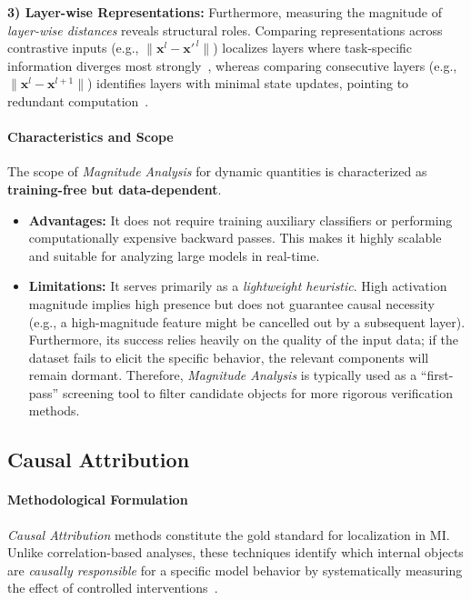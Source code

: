 \documentclass[11pt,letterpaper]{mystyle}
\begin{document}
\textbf{3) Layer-wise Representations:} Furthermore, measuring the magnitude of \textit{layer-wise distances} reveals structural roles. 
Comparing representations across contrastive inputs (e.g., $\lVert \mathbf{x}^l - \mathbf{x}'^{\,l} \rVert$) localizes layers where task-specific information diverges most strongly~\citep{chuang2024dola,zhang-etal-2024-truthx,sun-etal-2025-personality,bas2025steering}, whereas comparing consecutive layers (e.g., $\lVert \mathbf{x}^l - \mathbf{x}^{l+1} \rVert$) identifies layers with minimal state updates, pointing to redundant computation~\citep{dumitru2024layer,elhoushi-etal-2024-layerskip,tan2024dlo,lawson2025learningskipmiddlelayers,men-etal-2025-shortgpt}.


\paragraph{Characteristics and Scope}
The scope of \textit{Magnitude Analysis} for dynamic quantities is characterized as \textbf{training-free but data-dependent}.
\begin{itemize}[leftmargin=*]
    \item \textbf{Advantages:} It does not require training auxiliary classifiers or performing computationally expensive backward passes. This makes it highly scalable and suitable for analyzing large models in real-time.
    \item \textbf{Limitations:} It serves primarily as a \textit{lightweight heuristic}. High activation magnitude implies high presence but does not guarantee causal necessity (e.g., a high-magnitude feature might be cancelled out by a subsequent layer). Furthermore, its success relies heavily on the quality of the input data; if the dataset fails to elicit the specific behavior, the relevant components will remain dormant. Therefore, \textit{Magnitude Analysis} is typically used as a ``first-pass'' screening tool to filter candidate objects for more rigorous verification methods.
\end{itemize}



\subsection{Causal Attribution}
\label{sec:causal_Attribution}

\paragraph{Methodological Formulation}
\textit{Causal Attribution} methods constitute the gold standard for localization in MI. Unlike correlation-based analyses, these techniques identify which internal objects are \emph{causally responsible} for a specific model behavior by systematically measuring the effect of controlled interventions~\citep{vig2020gender,meng2022ccs,zhang2023towards,stolfo-etal-2023-mechanistic,yucausal_emnlp2024,geiger2025causal,ferreira2025truthfulfabricatedusingcausal,yeo2025towards}.
\end{document}
